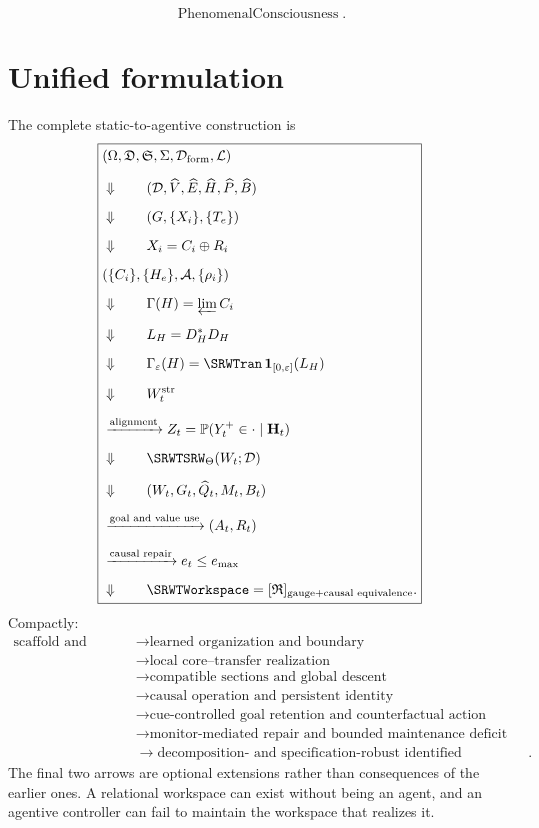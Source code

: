 \[
\operatorname{PhenomenalConsciousness}.
\]


\chapter{Unified formulation}\label{SRWT:book:chapter-91}


The complete static-to-agentive construction is
\[
\boxed{
\begin{aligned}
&
(\Omega,\mathfrak D,\mathfrak S,\Sigma,\mathcal D_{\mathrm{form}},\mathcal L)
\\[2mm]
&\Downarrow
\qquad
(\mathcal D,\widehat V,\widehat E,\widehat H,\widehat P,\widehat B)
\\[2mm]
&\Downarrow
\qquad
(G,\{X_i\},\{T_e\})
\\[2mm]
&\Downarrow
\qquad
X_i=C_i\oplus R_i
\\[2mm]
&
(\{C_i\},\{H_e\},\mathcal A,\{\rho_i\})
\\[2mm]
&\Downarrow
\qquad
\Gamma(H)=\varprojlim C_i
\\[2mm]
&\Downarrow
\qquad
L_H=D_H^*D_H
\\[2mm]
&\Downarrow
\qquad
\Gamma_\varepsilon(H)
=
\SRWTran\,\mathbf 1_{[0,\varepsilon]}(L_H)
\\[2mm]
&\Downarrow
\qquad
W_t^{\mathrm{str}}
\\[2mm]
&\xrightarrow{\text{alignment}}
Z_t=\mathbb P(Y_t^+\in\cdot\mid\mathbf H_t)
\\[2mm]
&\Downarrow
\qquad
\SRWTSRW_\Theta(W_t;\mathcal D)
\\[2mm]
&\Downarrow
\qquad
(W_t,G_t,\widehat Q_t,M_t,B_t)
\\[2mm]
&\xrightarrow{\text{goal and value use}}
(A_t,R_t)
\\[2mm]
&\xrightarrow{\text{causal repair}}
e_t\leq e_{\max}
\\[2mm]
&\Downarrow
\qquad
\SRWTWorkspace
=
[\mathfrak R]_{\text{gauge}+\text{causal equivalence}}.
\end{aligned}
}
\]
Compactly:
\[
\boxed{
\begin{aligned}
\text{scaffold and history}
&\to
\text{learned organization and boundary}
\\
&\to
\text{local core--transfer realization}
\\
&\to
\text{compatible sections and global descent}
\\
&\to
\text{causal operation and persistent identity}
\\
&\to
\text{cue-controlled goal retention and counterfactual action}
\\
&\to
\text{monitor-mediated repair and bounded maintenance deficit}
\\
&\to
\text{decomposition- and specification-robust identified certification}.
\end{aligned}
}
\]
The final two arrows are optional extensions rather than consequences of the
earlier ones. A relational workspace can exist without being an agent, and an
agentive controller can fail to maintain the workspace that realizes it.

